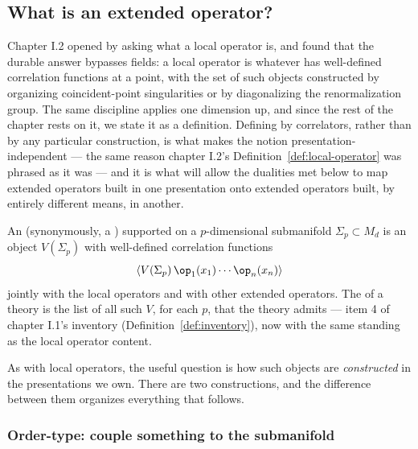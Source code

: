 \subsection{What is an extended operator?}
\label{sec:what-is-defect}

Chapter I.2 opened by asking what a local operator is, and found that
the durable answer bypasses fields: a local operator is whatever has
well-defined correlation functions at a point, with the set of such objects
constructed by organizing coincident-point singularities or by
diagonalizing the renormalization group. The same discipline applies one
dimension up, and since the rest of the chapter rests on it, we state it
as a definition. Defining by correlators, rather than by any particular
construction, is what makes the notion presentation-independent --- the
same reason chapter I.2's Definition~\ref{def:local-operator} was phrased
as it was --- and it is what will allow the dualities met below to map
extended operators built in one presentation onto extended operators
built, by entirely different means, in another.

\begin{ddefinition}
\label{def:extended-operator}
An  (synonymously, a ) supported
on a $p$-dimensional submanifold $\Sigma_p \subset M_d$ is an object
$V(\Sigma_p)$ with well-defined correlation functions
\begin{equation}
\left\langle V(\Sigma_p)\, \op_1(x_1) \cdots \op_n(x_n) \right\rangle
\label{eq:defect-correlator}
\end{equation}
jointly with the local operators and with other extended operators. The
 of a theory is the list of all such
$V$, for each $p$, that the theory admits --- item 4 of chapter I.1's
inventory (Definition~\ref{def:inventory}), now with the same standing
as the local operator content.
\end{ddefinition}

\noin As with local operators, the useful question is how such objects
are \emph{constructed} in the presentations we own. There are two
constructions, and the difference between them organizes everything that
follows.

\subsubsection{Order-type: couple something to the submanifold}
\label{sec:order-type}


